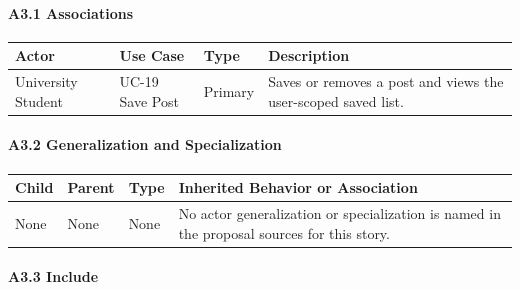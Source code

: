 \documentclass[12pt]{article}
\renewcommand{\baselinestretch}{1.5}
\begin{document}
\hypertarget{sec:a3-1-associations}{}
\paragraph*{A3.1 Associations}
\par\medskip

\begingroup
\small
\renewcommand{\baselinestretch}{1.0}\selectfont
\renewcommand{\arraystretch}{1.15}
\setlength{\tabcolsep}{6pt}
\begin{longtable}{|>{\raggedright\arraybackslash}p{}|>{\raggedright\arraybackslash}p{}|>{\raggedright\arraybackslash}p{}|>{\raggedright\arraybackslash}p{}|}
\hline
\textbf{Actor} & \textbf{Use Case} & \textbf{Type} & \textbf{Description} \\ \hline
\endhead
University Student & UC-19 Save Post & Primary & Saves or removes a post and views the user-scoped saved list. \\ \hline
\end{longtable}
\endgroup
\par\medskip

\hypertarget{sec:a3-2-generalization-and-specialization}{}
\paragraph*{A3.2 Generalization and Specialization}
\par\medskip

\begingroup
\small
\renewcommand{\baselinestretch}{1.0}\selectfont
\renewcommand{\arraystretch}{1.15}
\setlength{\tabcolsep}{6pt}
\begin{longtable}{|>{\raggedright\arraybackslash}p{}|>{\raggedright\arraybackslash}p{}|>{\raggedright\arraybackslash}p{}|>{\raggedright\arraybackslash}p{}|}
\hline
\textbf{Child} & \textbf{Parent} & \textbf{Type} & \textbf{Inherited Behavior or Association} \\ \hline
\endhead
None & None & None & No actor generalization or specialization is named in the proposal sources for this story. \\ \hline
\end{longtable}
\endgroup
\par\medskip

\hypertarget{sec:a3-3-include}{}
\paragraph*{A3.3 Include}
\par\medskip
\end{document}

